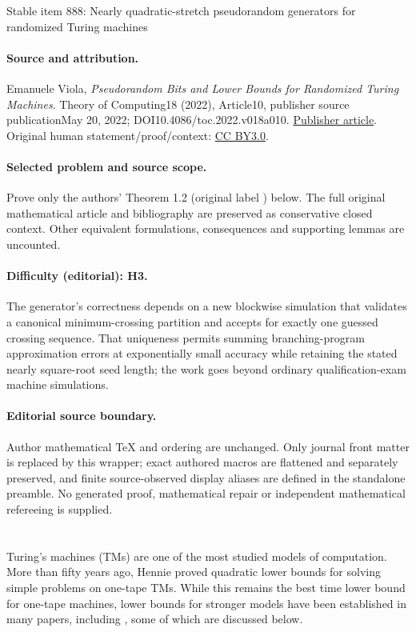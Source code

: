 \documentclass[11pt]{article}
\numberwithin{equation}{section}
\theoremstyle{definition}
\theoremstyle{plain}
\begin{document}
\begin{center}{\Large Stable item 888: Nearly quadratic-stretch pseudorandom generators for randomized Turing machines}\end{center}
\paragraph{Source and attribution.}
Emanuele Viola, \emph{Pseudorandom Bits and Lower Bounds for Randomized Turing Machines}. Theory of Computing18 (2022), Article10, publisher source publicationMay 20, 2022; DOI10.4086/toc.2022.v018a010. \href{https://theoryofcomputing.org/articles/v018a010/}{Publisher article}. Original human statement/proof/context: \href{https://creativecommons.org/licenses/by/3.0/}{CC BY3.0}.
\paragraph{Selected problem and source scope.}
Prove only the authors' Theorem 1.2 (original label ) below. The full original mathematical article and bibliography are preserved as conservative closed context. Other equivalent formulations, consequences and supporting lemmas are uncounted.
\paragraph{Difficulty (editorial): H3.}
The generator’s correctness depends on a new blockwise simulation that validates a canonical minimum-crossing partition and accepts for exactly one guessed crossing sequence. That uniqueness permits summing branching-program approximation errors at exponentially small accuracy while retaining the stated nearly square-root seed length; the work goes beyond ordinary qualification-exam machine simulations.
\paragraph{Editorial source boundary.}
Author mathematical TeX and ordering are unchanged. Only journal front matter is replaced by this wrapper; exact authored macros are flattened and separately preserved, and finite source-observed display aliases are defined in the standalone preamble. No generated proof, mathematical repair or independent mathematical refereeing is supplied.
\clearpage

%
\section{}      %
Turing's machines (TMs) %
are one of the most studied models of computation.
More than fifty years ago, Hennie proved quadratic lower bounds \cite{DBLP:journals/iandc/Hennie65}
for solving simple problems on one-tape TMs. While this remains the
best time lower bound for one-tape machines, lower bounds for stronger
models have been established in many papers, %
 including \cite{PPST83,MR808746,MaS87,KalyanasundaramS92,DBLP:conf/coco/Santhanam01,DBLP:journals/tcs/MelkebeekR05,DBLP:journals/cc/Williams06},
some of which are discussed below.
\end{document}
